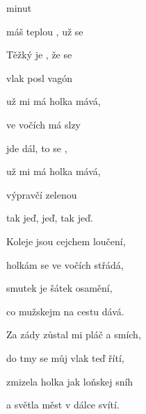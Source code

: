 

\zs
{}  minut  

máš teplou , už se 

Těžký je , že se  

vlak posl vagón 
\ks

\zr
{} už mi má holka mává,

ve vočích má slzy 

 jde dál, to se ,  

 už mi má holka mává,

výpravčí zelenou 

tak  jeď, jeď, tak jeď.
\kr

\zs
Koleje jsou cejchem loučení,

holkám se ve vočích střádá,

smutek je šátek osamění,

co mužskejm na cestu dává.
\ks

\zr  \kr

\zs
Za zády zůstal mi pláč a smích,

do tmy se můj vlak teď řítí,

zmizela holka jak loňskej sníh

a světla měst v dálce svítí.
\ks

\zr  \kr

\kp





